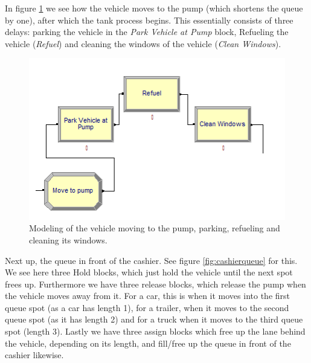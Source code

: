 In figure \ref{fig:refuelprocess} we see how the vehicle moves to the pump (which shortens the queue by one), after which the tank process begins. This essentially consists of three delays: parking the vehicle in the \textit{Park Vehicle at Pump} block, Refueling the vehicle (\textit{Refuel}) and cleaning the windows of the vehicle (\textit{Clean Windows}).

\begin{figure}[]
\begin{center}
	\includegraphics[scale=1]{images/model-description/refuel-process.PNG}
	\caption{Modeling of the vehicle moving to the pump, parking, refueling and cleaning its windows.}
	\label{fig:refuelprocess}
\end{center}
\end{figure}

Next up, the queue in front of the cashier. See figure \ref{fig:cashierqueue} for this. We see here three Hold blocks, which just hold the vehicle until the next spot frees up. Furthermore we have three release blocks, which release the pump when the vehicle moves away from it. For a car, this is when it moves into the first queue spot (as a car has length 1), for a trailer, when it moves to the second queue spot (as it has length 2) and for a truck when it moves to the third queue spot (length 3). Lastly we have three assign blocks which free up the lane behind the vehicle, depending on its length, and fill/free up the queue in front of the cashier likewise.

